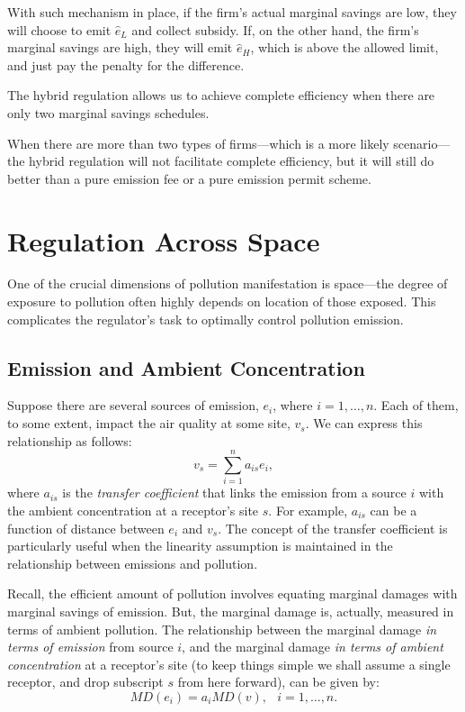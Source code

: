 \documentclass[
]{book}
\begin{document}
With such mechanism in place, if the firm's actual marginal savings are low, they will choose to emit \(\hat{e}_L\) and collect subsidy. If, on the other hand, the firm's marginal savings are high, they will emit \(\hat{e}_H\), which is above the allowed limit, and just pay the penalty for the difference.

The hybrid regulation allows us to achieve complete efficiency when there are only two marginal savings schedules.

When there are more than two types of firms---which is a more likely scenario---the hybrid regulation will not facilitate complete efficiency, but it will still do better than a pure emission fee or a pure emission permit scheme.

\hypertarget{regulation-across-space}{%
\chapter{Regulation Across Space}\label{regulation-across-space}}

One of the crucial dimensions of pollution manifestation is space---the degree of exposure to pollution often highly depends on location of those exposed. This complicates the regulator's task to optimally control pollution emission.

\hypertarget{emission-and-ambient-concentration}{%
\section{Emission and Ambient Concentration}\label{emission-and-ambient-concentration}}

Suppose there are several sources of emission, \(e_i\), where \(i=1,\ldots,n\). Each of them, to some extent, impact the air quality at some site, \(v_s\). We can express this relationship as follows: \[v_s = \sum_{i=1}^{n}a_{is}e_i,\] where \(a_{is}\) is the \emph{transfer coefficient} that links the emission from a source \(i\) with the ambient concentration at a receptor's site \(s\). For example, \(a_{is}\) can be a function of distance between \(e_i\) and \(v_s\). The concept of the transfer coefficient is particularly useful when the linearity assumption is maintained in the relationship between emissions and pollution.

Recall, the efficient amount of pollution involves equating marginal damages with marginal savings of emission. But, the marginal damage is, actually, measured in terms of ambient pollution. The relationship between the marginal damage \emph{in terms of emission} from source \(i\), and the marginal damage \emph{in terms of ambient concentration} at a receptor's site (to keep things simple we shall assume a single receptor, and drop subscript \(s\) from here forward), can be given by: \[MD(e_i) = a_{i}MD(v),\;~~i=1,\ldots,n.\]
\end{document}
